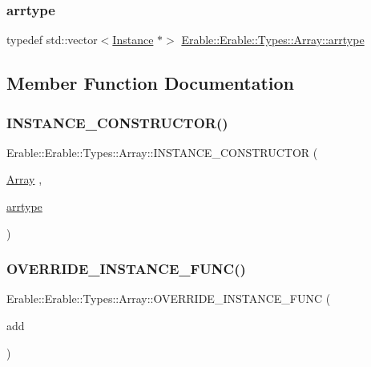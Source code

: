 \subsubsection{\texorpdfstring{arrtype}{arrtype}}
{\footnotesize\ttfamily typedef std\+::vector$<$\mbox{\hyperlink{class_erable_1_1_erable_1_1_types_1_1_instance}{Instance}} $\ast$$>$ \mbox{\hyperlink{class_erable_1_1_erable_1_1_types_1_1_array_ac691ce334c0eea6cfadc7877db148ccf}{Erable\+::\+Erable\+::\+Types\+::\+Array\+::arrtype}}}



\subsection{Member Function Documentation}
\mbox{\label{class_erable_1_1_erable_1_1_types_1_1_array_afee721ff208849298512f8d92c29ecb4}} 
\subsubsection{\texorpdfstring{INSTANCE\_CONSTRUCTOR()}{INSTANCE\_CONSTRUCTOR()}}
{\footnotesize\ttfamily Erable\+::\+Erable\+::\+Types\+::\+Array\+::\+I\+N\+S\+T\+A\+N\+C\+E\+\_\+\+C\+O\+N\+S\+T\+R\+U\+C\+T\+OR (\begin{DoxyParamCaption}\item[{\mbox{\hyperlink{class_erable_1_1_erable_1_1_types_1_1_array}{Array}}}]{,  }\item[{\mbox{\hyperlink{class_erable_1_1_erable_1_1_types_1_1_array_ac691ce334c0eea6cfadc7877db148ccf}{arrtype}}}]{ }\end{DoxyParamCaption})}

\mbox{\label{class_erable_1_1_erable_1_1_types_1_1_array_a34fbaf9668691c6a765c52693073f83c}} 
\subsubsection{\texorpdfstring{OVERRIDE\_INSTANCE\_FUNC()}{OVERRIDE\_INSTANCE\_FUNC()}\hspace{0.1cm}{\footnotesize\ttfamily [1/4]}}
{\footnotesize\ttfamily Erable\+::\+Erable\+::\+Types\+::\+Array\+::\+O\+V\+E\+R\+R\+I\+D\+E\+\_\+\+I\+N\+S\+T\+A\+N\+C\+E\+\_\+\+F\+U\+NC (\begin{DoxyParamCaption}\item[{add}]{ }\end{DoxyParamCaption})}

